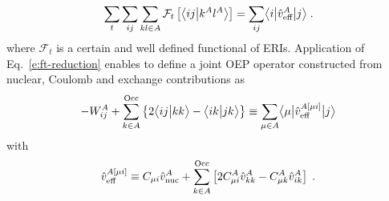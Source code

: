 \documentclass[aip,jcp,amsmath,amssymb,preprint,floatfix]{revtex4-1}
\begin{document}
%
\begin{equation} \label{e:ft-reduction}
	\sum_t \sum_{ij}\sum_{kl\in A} {\mathcal{F}}_t\left[ 
   \bigl\langle {ij} \bigl\lvert {k^Al^A} \bigr\rangle
 \right] = \sum_{ij} \bigl\langle {i} \bigl\lvert {\hat{v}_{\text{eff}}^A} \bigl\lvert {j} \bigr\rangle \;.
\end{equation}
%
where ${\mathcal{F}}_t$ is a certain and well defined functional of ERIs.
Application of Eq.~\eqref{e:ft-reduction} enables to define
a joint OEP
operator constructed from nuclear, Coulomb and exchange
contributions as
%
\begin{equation}
 -W^A_{ij} + 
 \sum_{k\in A}^{\rm Occ} 
  \left\{ 2\bigl\langle {ij} \bigl\lvert {kk} \bigr\rangle - \bigl\langle {ik} \bigl\lvert {jk} \bigr\rangle \right\}
\equiv \sum_{\mu\in A} \bigl\langle {\mu} \bigl\lvert { 
\hat{v}^{A[\mu i]}_{\rm eff}
 } \bigl\lvert {j} \bigr\rangle
\end{equation}
%
with
%
\begin{equation}
 \hat{v}^{A[\mu i]}_{\rm eff} \equiv C_{\mu i} \hat{v}^A_{\rm nuc} + 
 \sum_{k\in A}^{\rm Occ} \left[
 2C_{\mu i}^A \hat{v}^A_{kk} - C_{\mu k}^A \hat{v}^A_{ik}
 \right] \;.
\end{equation}
%
%
%
\end{document}
